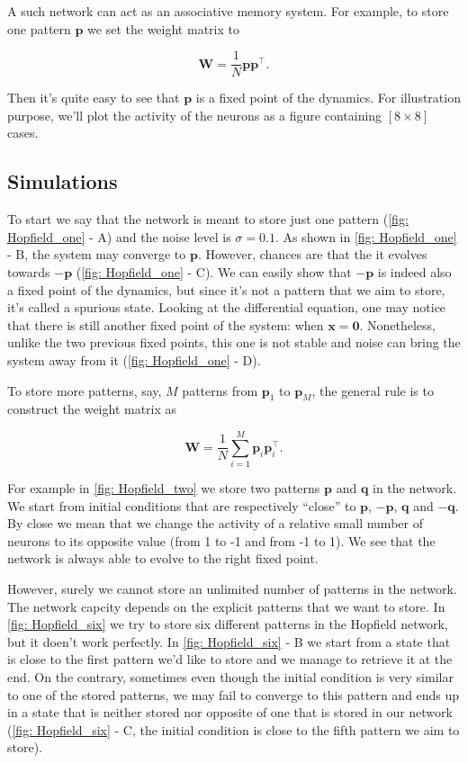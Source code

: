 A such network can act as an associative memory system. For example, to store
one pattern $\mathbf{p}$ we set the weight matrix to 

\[\mathbf{W} = \frac{1}{N} \mathbf{p}\mathbf{p}^{\top}.\]

\noindent
Then it's quite easy to see that $\mathbf{p}$ is a fixed point of the
dynamics. For illustration purpose, we'll plot the activity of the neurons
as a figure containing $[8 \times 8]$ cases.

\subsection{Simulations}

To start we say that the network is meant to store just one pattern 
(\autoref{fig: Hopfield_one} - \textsf{A}) and the
noise level is $\sigma = 0.1$. As shown in \autoref{fig: Hopfield_one} -
\textsf{B}, the system may converge to $\mathbf{p}$. However, chances are 
that the it evolves towards $-\mathbf{p}$ 
(\autoref{fig: Hopfield_one} - \textsf{C}). We can easily show
that $-\mathbf{p}$ is indeed also a fixed point of the dynamics, but since
it's not a pattern that we aim to store, it's called a spurious state.
Looking at the differential equation, one may notice that there is still
another fixed point of the system: when $\mathbf{x} = \mathbf{0}$. 
Nonetheless, unlike the two previous fixed points, this one is not stable
and noise can bring the system away from it (\autoref{fig: Hopfield_one} -
\textsf{D}).

To store more patterns, say, $M$ patterns from $\mathbf{p}_1$ to 
$\mathbf{p}_M$, the general rule is to construct the weight matrix as

\[\mathbf{W} = \frac{1}{N} \sum_{i=1}^M \mathbf{p}_i\mathbf{p}_i^{\top}.\]

\noindent
For example in \autoref{fig: Hopfield_two} we store two patterns $\mathbf{p}$
and $\mathbf{q}$ in the network. We start from 
initial conditions that are respectively ``close'' to $\mathbf{p}$,
$-\mathbf{p}$, $\mathbf{q}$ and $-\mathbf{q}$. By close we mean that we change
the activity of a relative small number of neurons to its opposite value 
(from 1 to -1 and from -1 to 1). We see that the network is always able
to evolve to the right fixed point.

However, surely we cannot store an unlimited number of patterns in the 
network. The network capcity depends on the explicit patterns that we want
to store. In \autoref{fig: Hopfield_six} we try to store six different 
patterns in the Hopfield network, but it doen't work perfectly.
In \autoref{fig: Hopfield_six} - \textsf{B} we start from a state that is
close to the first pattern we'd like to store and we manage to retrieve it
at the end. On the contrary, sometimes even though the initial condition 
is very similar to one of the stored patterns, we may fail to converge to 
this pattern and ends up in a state that is neither stored nor opposite of 
one that is stored in our network (\autoref{fig: Hopfield_six} -
\textsf{C}, the initial condition is close to the fifth pattern we aim to
store).

